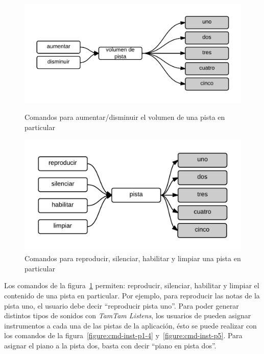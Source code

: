 \begin{figure}[H]  
\begin{minipage}[b]{0.5\linewidth}
\centering
\includegraphics[width=0.8\linewidth]{./graphics/vol-pista.png}
\caption{Comandos para aumentar/disminuir el volumen de una pista en particular}
\label{figure:cmd-vol-pista-anexo}
\end{minipage}
\quad
\begin{minipage}[b]{0.5\linewidth}
\centering
\includegraphics[width=0.9\linewidth]{./graphics/rep-pista.png}
\caption{Comandos para reproducir, silenciar, habilitar y limpiar una pista en particular}
\label{figure:cmd-rep-pista-anexo}
\end{minipage}
\end{figure}

Los comandos de la figura~\ref{figure:cmd-rep-pista-anexo} permiten: reproducir, silenciar, habilitar y limpiar el contenido de una
pista en particular. Por ejemplo, para reproducir las notas de la pista uno, el usuario debe decir ``reproducir pista uno''. 
Para poder generar distintos tipos de sonidos con \emph{TamTam Listens}, los usuarios de pueden asignar
instrumentos a cada una de las pistas de
la aplicaci\'on, \'esto se puede realizar con los comandos de la figura~\ref{figure:cmd-inst-p1-4} y~\ref{figure:cmd-inst-p5}. Para
asignar el piano a la pista dos, basta con decir ``piano en pista dos''.


